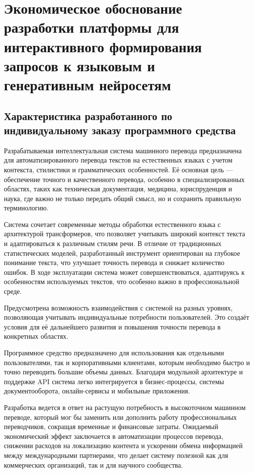 \section{Экономическое обоснование разработки платформы для интерактивного формирования запросов к языковым и генеративным нейросетям}
\label{sec:economics}

\subsection{Характеристика разработанного по индивидуальному заказу  программного средства}

Разрабатываемая интеллектуальная система машинного перевода предназначена для автоматизированного перевода текстов на естественных языках с учетом контекста, стилистики и грамматических особенностей. Её основная цель — обеспечение точного и качественного перевода, особенно в специализированных областях, таких как техническая документация, медицина, юриспруденция и наука, где важно не только передать общий смысл, но и сохранить правильную терминологию.  

Система сочетает современные методы обработки естественного языка с архитектурой трансформеров, что позволяет учитывать широкий контекст текста и адаптироваться к различным стилям речи. В отличие от традиционных статистических моделей, разработанный инструмент ориентирован на глубокое понимание текста, что улучшает точность перевода и снижает количество ошибок. В ходе эксплуатации система может совершенствоваться, адаптируясь к особенностям используемых текстов, что особенно важно в профессиональной среде.

Предусмотрена возможность взаимодействия с системой на разных уровнях, позволяющая учитывать индивидуальные потребности пользователей. Это создаёт условия для её дальнейшего развития и повышения точности перевода в конкретных областях.

Программное средство предназначено для использования как отдельными пользователями, так и корпоративными клиентами, которым необходимо быстро и точно переводить большие объемы данных. Благодаря модульной архитектуре и поддержке API система легко интегрируется в бизнес-процессы, системы документооборота, онлайн-сервисы и мобильные приложения.  

Разработка ведется в ответ на растущую потребность в высокоточном машинном переводе, который мог бы заменить или дополнить работу профессиональных переводчиков, сокращая временные и финансовые затраты. Ожидаемый экономический эффект заключается в автоматизации процессов перевода, снижении расходов на локализацию контента и ускорении обмена информацией между международными партнерами, что делает систему полезной как для коммерческих организаций, так и для научного сообщества.

